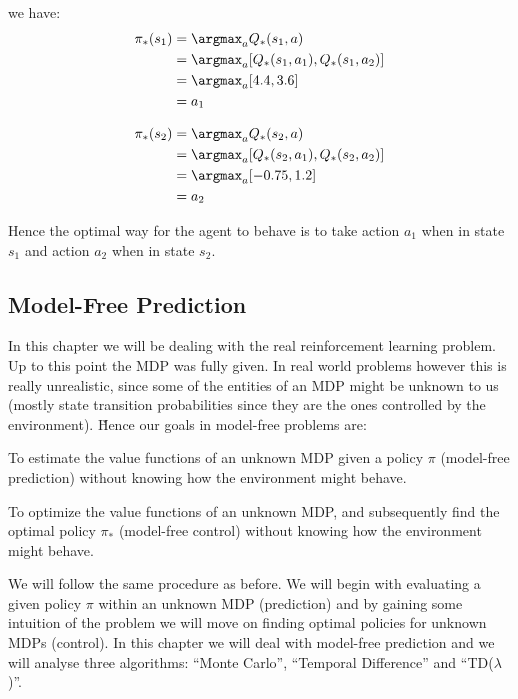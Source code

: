 we have:
\begin{align*}
\pi_*(s_1) &= \argmax_{a} Q_*(s_1,a) \\
&= \argmax_{a} [Q_*(s_1,a_1), Q_*(s_1,a_2)] \\
&= \argmax_{a} [4.4, 3.6] \\
&= a_1
\end{align*}

\vspace{-15pt}

\begin{align*}
\pi_*(s_2) &= \argmax_{a} Q_*(s_2,a) \\
&= \argmax_{a} [Q_*(s_2,a_1), Q_*(s_2,a_2)] \\
&= \argmax_{a} [-0.75, 1.2] \\
&= a_2
\end{align*}

Hence the optimal way for the agent to behave is to take action $a_1$ when in state $s_1$ and action $a_2$ when in
state $s_2$.

\subsection{Model-Free Prediction}

In this chapter we will be dealing with the real reinforcement learning problem. Up to this point the MDP was fully
given. In real world problems however this is really unrealistic, since some of the entities of an MDP might be
unknown to us (mostly state transition probabilities since they are the ones controlled by the environment). \v

Hence our goals in model-free problems are:
\bit
\item To estimate the value functions of an unknown MDP given a policy $\pi$ (model-free prediction) without knowing
how the environment might behave.
\item To optimize the value functions of an unknown MDP, and subsequently find the optimal policy $\pi_*$ (model-free
control) without knowing how the environment might behave.
\eit

We will follow the same procedure as before. We will begin with evaluating a given policy $\pi$ within an unknown MDP
(prediction) and by gaining some intuition of the problem we will move on finding optimal policies for unknown MDPs
(control). In this chapter we will deal with model-free prediction and we will analyse three algorithms: ``Monte
Carlo'', ``Temporal Difference'' and ``TD($\lambda$)''.

